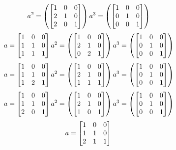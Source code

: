 \begin{mdframed}[style=darkAnswer,frametitle={Joe Starr}]
\begin{itemize}
{$$a^{ 2 }=\left( \begin{bmatrix}1&0&0\\2&1&0\\2&0&1\end{bmatrix} \right)
a^{ 3 }=\left( \begin{bmatrix}1&0&0\\0&1&0\\0&0&1\end{bmatrix} \right)
$$ $$
a= \begin{bmatrix}1&0&0\\1&1&0\\1&1&1\end{bmatrix} \\
a^{ 2 }=\left( \begin{bmatrix}1&0&0\\2&1&0\\0&2&1\end{bmatrix} \right)
a^{ 3 }=\left( \begin{bmatrix}1&0&0\\0&1&0\\0&0&1\end{bmatrix} \right)
$$ $$
a= \begin{bmatrix}1&0&0\\1&1&0\\1&2&1\end{bmatrix} \\
a^{ 2 }=\left( \begin{bmatrix}1&0&0\\2&1&0\\1&1&1\end{bmatrix} \right)
a^{ 3 }=\left( \begin{bmatrix}1&0&0\\0&1&0\\0&0&1\end{bmatrix} \right)
$$ $$
a= \begin{bmatrix}1&0&0\\1&1&0\\2&0&1\end{bmatrix} \\
a^{ 2 }=\left( \begin{bmatrix}1&0&0\\2&1&0\\1&0&1\end{bmatrix} \right)
a^{ 3 }=\left( \begin{bmatrix}1&0&0\\0&1&0\\0&0&1\end{bmatrix} \right)
$$ $$
a= \begin{bmatrix}1&0&0\\1&1&0\\2&1&1\end{bmatrix} \\
$$}
\end{itemize}
\end{mdframed}
